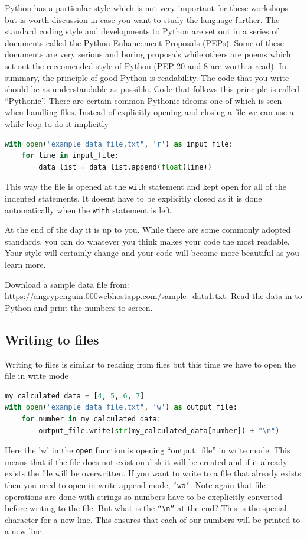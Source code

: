 		Python has a particular style which is not very important for these workshops but is worth discussion in case you want to study the language further. The standard coding style and developments to Python are set out in a series of documents called the Python Enhancement Proposals (PEPs). Some of these documents are very serious and boring proposals while others are poems which set out the reccomended style of Python (PEP 20 and 8 are worth a read). In summary, the principle of good Python is readability. The code that you write should be as understandable as possible. Code that follows this principle is called ``Pythonic''. There are certain common Pythonic ideoms one of which is seen when handling files. Instead of explicitly opening and closing a file we can use a while loop to do it implicitly
		\begin{lstlisting}[language=Python]
with open("example_data_file.txt", 'r') as input_file:
	for line in input_file:
		data_list = data_list.append(float(line))
\end{lstlisting}	
This way the file is opened at the \texttt{with} statement and kept open for all of the indented statements. It doesnt have to be explicitly closed as it is done automatically when the \texttt{with} statement is left.

At the end of the day it is up to you. While there are some commonly adopted standards, you can do whatever you think makes your code the most readable. Your style will certainly change and your code will become more beautiful as you learn more.

\begin{task}Download a sample data file from: \url{https://angrypenguin.000webhostapp.com/sample_data1.txt}. Read the data in to Python and print the numbers to screen.\end{task}

	\subsection{Writing to files}
		Writing to files is similar to reading from files but this time we have to open the file in write mode
		\begin{lstlisting}[language=Python]
my_calculated_data = [4, 5, 6, 7]
with open("example_data_file.txt", 'w') as output_file:
	for number in my_calculated_data:
		output_file.write(str(my_calculated_data[number]) + "\n")
\end{lstlisting}	
	Here the 'w' in the \texttt{open} function is opening ``output\_file'' in write mode. This means that if the file does not exist on disk it will be created and if it already exists the file will be overwritten. If you want to write to a file that already exists then you need to open in write append mode, \texttt{`wa'}.
Note again that file operations are done with strings so numbers have to be excplicitly converted before writing to the file. But what is the \texttt{``\textbackslash{}n''} at the end? This is the special character for a new line. This ensures that each of our numbers will be printed to a new line.

